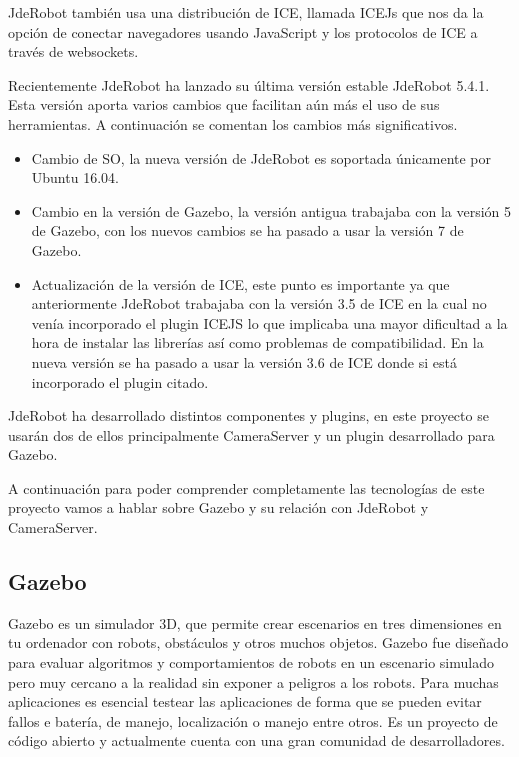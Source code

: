 JdeRobot también usa una distribución de ICE, llamada ICEJs  que nos da la opción de conectar navegadores usando JavaScript y los protocolos de ICE a través de websockets.

Recientemente JdeRobot ha lanzado su última versión estable JdeRobot 5.4.1. Esta versión aporta varios cambios que facilitan aún más el uso de sus herramientas. A continuación se comentan los cambios más significativos.

\begin{itemize}
    \item Cambio de SO, la nueva versión de JdeRobot es soportada únicamente por Ubuntu 16.04.
    \item Cambio en la versión de Gazebo, la versión antigua trabajaba con la versión 5 de Gazebo, con los nuevos cambios se ha pasado a usar la versión 7 de Gazebo.
    \item Actualización de la versión de ICE, este punto es importante ya que anteriormente JdeRobot trabajaba con la versión 3.5 de ICE en la cual no venía incorporado el plugin ICEJS lo que implicaba una mayor dificultad a la hora de instalar las librerías así como problemas de compatibilidad. En la nueva versión se ha pasado a usar la versión 3.6 de ICE donde si está incorporado el plugin citado.

\end{itemize}

JdeRobot ha desarrollado distintos componentes y plugins, en este proyecto se usarán dos de ellos principalmente CameraServer y un plugin desarrollado para Gazebo.

A continuación  para poder comprender completamente las tecnologías  de este proyecto vamos a hablar sobre Gazebo y su relación con JdeRobot y CameraServer.

\subsection{Gazebo}

Gazebo es un simulador 3D, que permite crear escenarios en tres dimensiones en tu ordenador con robots, obstáculos y otros muchos objetos. Gazebo fue diseñado para evaluar algoritmos y comportamientos de robots en un escenario simulado pero muy cercano a la realidad sin exponer a peligros a los robots. Para muchas aplicaciones es esencial testear las aplicaciones de forma que se pueden evitar fallos e batería, de manejo, localización o manejo entre otros. Es un proyecto de código abierto y actualmente cuenta con una gran comunidad de desarrolladores.


